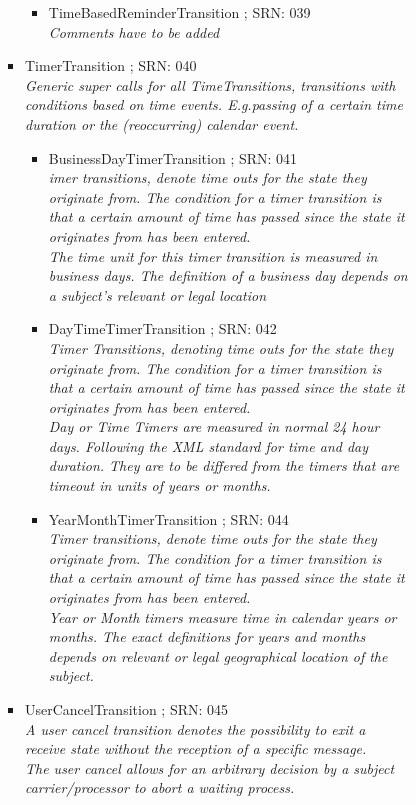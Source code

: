 \begin{itemize}
\begin{itemize}
\begin{itemize}
\begin{itemize}
\begin{itemize}
\begin{itemize}
						\item TimeBasedReminderTransition ; SRN: 039 \\ \textit{Comments have to be added}
					\end{itemize}
					\item TimerTransition ; SRN: 040 \\ \textit{Generic super calls for all TimeTransitions, transitions with conditions based on time events. E.g.passing of a certain time duration or the (reoccurring) calendar event. }
					\begin{itemize}
						\item BusinessDayTimerTransition ; SRN: 041 \\ \textit{imer transitions, denote time outs for the state they originate from. The condition for a timer transition is that a certain amount of time has passed since the state it originates from has been entered.\\ The time unit for this timer transition is measured in business days. The definition of a business day depends on a subject's relevant or legal location}
						\item DayTimeTimerTransition ; SRN: 042 \\ \textit{Timer Transitions, denoting time outs for the state they originate from. The condition for a timer transition is that a certain amount of time has passed since the state it originates from has been entered.\\ Day or Time Timers are measured in normal 24 hour days. Following the XML standard for time and day duration. They are to be differed from the timers that are timeout in units of years or months.}
						\item YearMonthTimerTransition ; SRN: 044 \\ \textit{Timer transitions, denote time outs for the state they originate from. The condition for a timer transition is that a certain amount of time has passed since the state it originates from has been entered.\\ Year or Month timers measure time in calendar years or months. The exact definitions for years and months depends on relevant or legal geographical location of the subject.}
					\end{itemize}
					\item UserCancelTransition ; SRN: 045 \\ \textit{A user cancel transition denotes the possibility to exit a receive state without the reception of a specific message.\\ The user cancel allows for an arbitrary decision by a subject carrier/processor to abort a waiting process.}

\end{itemize}
\end{itemize}
\end{itemize}
\end{itemize}
\end{itemize}
